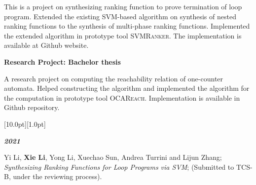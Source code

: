 \documentclass[12pt,a4paper,utf8]{report}
\begin{document}
\begin{minipage}[t]{15cm}
    \quad This is a project on synthesizing ranking function to prove termination of loop program. Extended the existing SVM-based algorithm on  synthesis of nested ranking functions to the synthesis of multi-phase ranking functions. Implemented the extended algorithm in prototype tool \textsc{SVMRanker}. The implementation is available at Github website.\par
    \vspace{0.2cm}
    {\textbf{Research Project: Bachelor thesis}}\par
    \qquad\qquad\qquad\qquad\qquad\qquad{}\par
    \quad A research project on computing the reachability relation of one-counter automata. Helped constructing the algorithm and implemented the algorithm for the computation in prototype tool \textsc{OCAReach}. Implementation is available in Github repository.\par
    
\end{minipage}\par
\vspace{0.4cm}

\begin{minipage}[t]{16cm}
    \colorbox{subtitlecolor}{\raisebox{0pt}[10.0pt][1.0pt]{
        \textcolor{white}{\textsf{}}}}
\end{minipage}\par
\vspace{0.2cm}\hspace{0.5cm}
\begin{minipage}[t]{15cm}
    {\textbf{\em{2021}}}\par
    \quad Yi Li, \textbf{Xie Li}, Yong Li, Xuechao Sun, Andrea Turrini and Lijun Zhang;{\em{ Synthesizing Ranking Functions for Loop Programs via SVM}}; (Submitted to TCS-B, under the reviewing process).\par
    \vspace{0.2cm}
\end{minipage}


\vspace{0.4cm}
\end{document}

